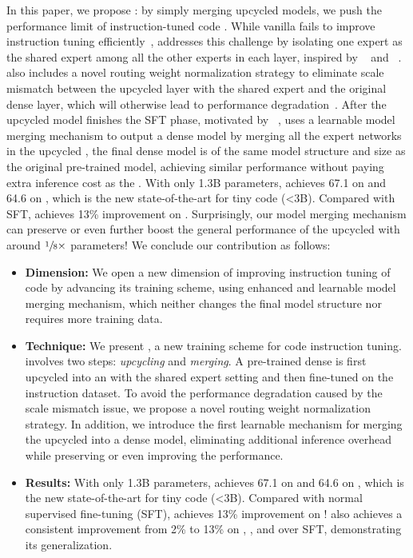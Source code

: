 In this paper, we propose \textbf{\ours}: 
by simply merging upcycled \moe models, we push the performance limit of instruction-tuned code .
While vanilla \sparseupcycle fails to improve instruction tuning efficiently~\cite{komatsuzaki2023sparse},
\ours addresses this challenge by isolating one expert as the shared expert among all the other experts in each \moe layer, inspired by \deepseekmoe~\cite{dai2024deepseekmoe} and \mocle~\cite{gou2024mixture}.
\ours also includes a novel routing weight normalization strategy to eliminate scale mismatch between the upcycled \moe layer with the shared expert and the original dense layer, which will otherwise lead to performance degradation~\cite{wu2022residual}. 
After the upcycled \moe model finishes the SFT phase, motivated by \modelsoup~\cite{wortsman2022model}, 
\ours uses a learnable model merging mechanism to output a dense model by merging all the expert networks in the upcycled \moe, 
\ie the final dense model is of the same model structure and size as the original pre-trained model,
achieving similar performance without paying extra inference cost as the \sparseupcycle.
With only 1.3B parameters, \ours achieves 67.1  on \humaneval and 64.6  on \humanevalp, which is the new state-of-the-art for tiny code  (<3B).
Compared with SFT, \ours achieves 13\% improvement on \humanevalp.
Surprisingly, our model merging mechanism can preserve or even further boost the general performance of the upcycled \moe with around $\sfrac{1}{8}\times$ parameters! 
We conclude our contribution as follows:
\begin{itemize}[leftmargin=1em]
    \setlength{\parskip}{2pt}
    \setlength\itemsep{0pt}
    \item \textbf{Dimension:} 
    We open a new dimension of improving instruction tuning of code  by advancing its training scheme, using enhanced \sparseupcycle and learnable model merging mechanism, which neither changes the final model structure nor requires more training data.
    \item \textbf{Technique:} 
    We present \ours, a new training scheme for code instruction tuning. \ours involves two steps: \emph{upcycling} and \emph{merging}. A pre-trained dense \llm is first upcycled into an \moe with the shared expert setting and then fine-tuned on the instruction dataset. To avoid the performance degradation caused by the scale mismatch issue,
    we propose a novel routing weight normalization strategy. In addition, we introduce the first learnable mechanism 
    for merging the upcycled \moe into a dense model, eliminating additional inference overhead while preserving or even improving the \moe performance.
    \item \textbf{Results:} With only 1.3B parameters, \ours achieves 67.1  on \humaneval and 64.6  on \humanevalp, which is the new state-of-the-art for tiny code  (<3B). Compared with normal supervised fine-tuning (SFT), \ours achieves 13\% improvement on \humanevalp! \ours also achieves a consistent improvement from 2\% to 13\% on \mbpp, \multiple, and \dsonek over SFT, demonstrating its generalization.
\end{itemize}
